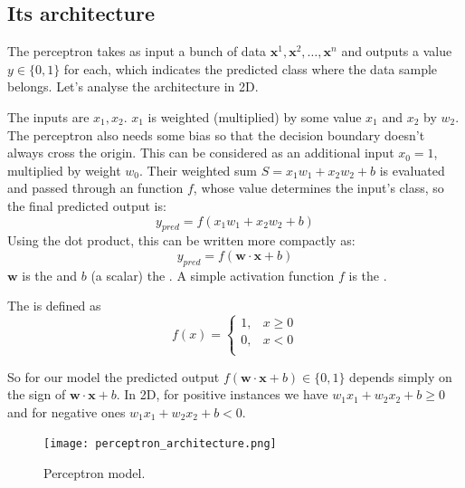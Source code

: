 \documentclass[a4paper]{article}
\begin{document}
\subsection{Its architecture}

The perceptron takes as input a bunch of data $\textbf{x}^1, \textbf{x}^2, \ldots , \textbf{x}^n$ and outputs a  value $y \in \{0,1\}$ for each, which indicates the predicted class where the data sample belongs. Let's analyse the architecture in 2D.

The inputs are $x_1, x_2$. $x_1$ is weighted (multiplied) by some value $x_1$ and $x_2$ by $w_2$. The perceptron also needs some bias so that the decision boundary doesn't always cross the origin. This can be considered as an additional input $x_0 = 1$, multiplied by weight $w_0$. Their weighted sum $S=x_1w_1 + x_2w_2 + b$ is evaluated and passed through an  function $f$, whose value determines the input's class, so the final predicted output is:
\begin{equation}
    y_{pred} =  f(x_1w_1 + x_2w_2 + b)
\end{equation}
Using the dot product, this can be written more compactly as:
\begin{equation}
    y_{pred} =  f(\textbf{w} \cdot \textbf{x} + b)
\end{equation}
$\textbf{w}$ is the  and $b$ (a scalar) the . A simple activation function $f$ is the .
\begin{definition}
The  is defined as
\begin{equation}
    f(x) = \left\{
\begin{array}{ll}
      1, & x\geq 0 \\
      0, & x<0\\
\end{array} \right.
\end{equation}
\end{definition}
So for our model the predicted output $f(\textbf{w} \cdot \textbf{x} + b) \in \{0,1\}$ depends simply on the sign of $\textbf{w} \cdot \textbf{x} + b$. In 2D, for positive instances we have $w_1x_1 + w_2x_2 + b \geq 0$ and for negative ones $w_1x_1 + w_2x_2 + b < 0$. 
\begin{figure}[H]
    \centering
    \texttt{[image: perceptron\_architecture.png]}
    \caption{Perceptron model.}
\end{figure}
\end{document}
